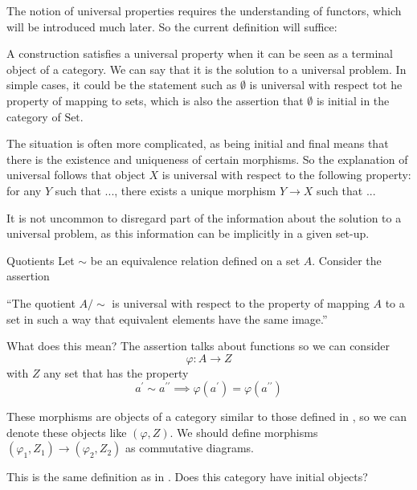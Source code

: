\documentclass{report}
\begin{document}
The notion of universal properties requires the understanding of functors, which will be introduced much later. So the current definition will suffice:

A construction satisfies a universal property when it can be seen as a terminal object of a category. We can say that it is the solution to a universal problem. In simple cases, it could be the statement such as $\emptyset$ is universal with respect tot he property of mapping to sets, which is also the assertion that $\emptyset$ is initial in the category of $\text{Set}$.

The situation is often more complicated, as being initial and final means that there is the existence and uniqueness of certain morphisms. So the explanation of universal follows that object $X$ is universal with respect to the following property: for any $Y$ such that ..., there exists a unique morphism $Y \rightarrow X$ such that ...

It is not uncommon to disregard part of the information about the solution to a universal problem, as this information can be implicitly in a given set-up.

\begin{definition}[\label{def:1.5.3}]{Quotients}
    Let $\sim $ be an equivalence relation defined on a set $A$. Consider the assertion
        \begin{center}
            ``The quotient $A/\sim $ is universal with respect to the property of mapping $A$ to a set in such a way that equivalent elements have the same image.''
        \end{center}
    What does this mean? The assertion talks about functions so we can consider
        \begin{equation*}
            \varphi: A \rightarrow Z
        \end{equation*}
    with $Z$ any set that has the property
        \begin{equation*}
            a^{\prime} \sim a^{\prime\prime} \implies \varphi(a^{\prime}) = \varphi(a^{\prime\prime})
        \end{equation*}
\end{definition}

These morphisms are objects of a category similar to those defined in , so we can denote these objects like $(\varphi, Z)$. We should define morphisms $(\varphi_{1}, Z_{1}) \rightarrow (\varphi_{2}, Z_{2})$ as commutative diagrams.
    \begin{center}
    \end{center}
This is the same definition as in . Does this category have initial objects?
\end{document}

